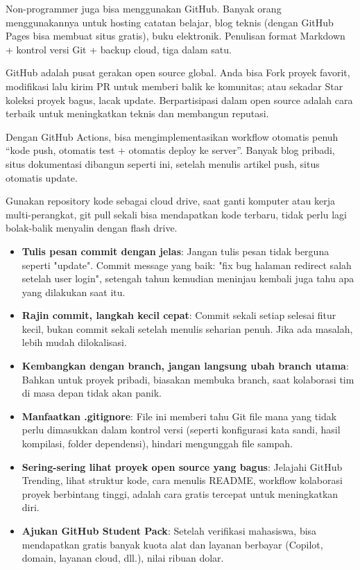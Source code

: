 
Non-programmer juga bisa menggunakan GitHub. Banyak orang menggunakannya untuk hosting catatan belajar, blog teknis (dengan GitHub Pages bisa membuat situs gratis), buku elektronik. Penulisan format Markdown + kontrol versi Git + backup cloud, tiga dalam satu.


GitHub adalah pusat gerakan open source global. Anda bisa Fork proyek favorit, modifikasi lalu kirim PR untuk memberi balik ke komunitas; atau sekadar Star koleksi proyek bagus, lacak update. Berpartisipasi dalam open source adalah cara terbaik untuk meningkatkan teknis dan membangun reputasi.


Dengan GitHub Actions, bisa mengimplementasikan workflow otomatis penuh “kode push, otomatis test + otomatis deploy ke server”. Banyak blog pribadi, situs dokumentasi dibangun seperti ini, setelah menulis artikel push, situs otomatis update.


Gunakan repository kode sebagai cloud drive, saat ganti komputer atau kerja multi-perangkat, git pull sekali bisa mendapatkan kode terbaru, tidak perlu lagi bolak-balik menyalin dengan flash drive.


\begin{itemize}
  \item \textbf{Tulis pesan commit dengan jelas}: Jangan tulis pesan tidak berguna seperti "update". Commit message yang baik: "fix bug halaman redirect salah setelah user login", setengah tahun kemudian meninjau kembali juga tahu apa yang dilakukan saat itu.
  \item \textbf{Rajin commit, langkah kecil cepat}: Commit sekali setiap selesai fitur kecil, bukan commit sekali setelah menulis seharian penuh. Jika ada masalah, lebih mudah dilokalisasi.
  \item \textbf{Kembangkan dengan branch, jangan langsung ubah branch utama}: Bahkan untuk proyek pribadi, biasakan membuka branch, saat kolaborasi tim di masa depan tidak akan panik.
  \item \textbf{Manfaatkan .gitignore}: File ini memberi tahu Git file mana yang tidak perlu dimasukkan dalam kontrol versi (seperti konfigurasi kata sandi, hasil kompilasi, folder dependensi), hindari mengunggah file sampah.
  \item \textbf{Sering-sering lihat proyek open source yang bagus}: Jelajahi GitHub Trending, lihat struktur kode, cara menulis README, workflow kolaborasi proyek berbintang tinggi, adalah cara gratis tercepat untuk meningkatkan diri.
  \item \textbf{Ajukan GitHub Student Pack}: Setelah verifikasi mahasiswa, bisa mendapatkan gratis banyak kuota alat dan layanan berbayar (Copilot, domain, layanan cloud, dll.), nilai ribuan dolar.
\end{itemize}

